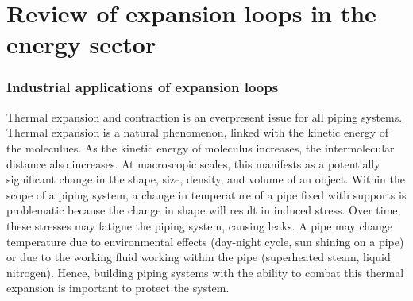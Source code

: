 \part{Review of expansion loops in the energy sector}
\section{Industrial applications of expansion loops}
Thermal expansion and contraction is an everpresent issue for all piping systems. Thermal expansion is a natural phenomenon, linked with the kinetic energy of the moleculues. As the kinetic energy of moleculus increases, the intermolecular distance also increases. At macroscopic scales, this manifests as a potentially significant change in the shape, size, density, and volume of an object. Within the scope of a piping system, a change in temperature of a pipe fixed with supports is problematic because the change in shape will result in induced stress. Over time, these stresses may fatigue the piping system, causing leaks. A pipe may change temperature due to environmental effects (day-night cycle, sun shining on a pipe) or due to the working fluid working within the pipe (superheated steam, liquid nitrogen). Hence, building piping systems with the ability to combat this thermal expansion is important to protect the system. 


